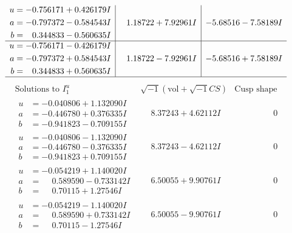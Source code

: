 \documentclass[1p]{elsarticle_modified}
\theoremstyle{definition}
\newcommand{\I}{\sqrt{-1}}
\begin{document}
$$\begin{array}{c|c|c}
\begin{aligned}
u &= -0.756171 + 0.426179 I \\
a &= -0.797372 - 0.584543 I \\
b &= \phantom{-}0.344833 - 0.560635 I\end{aligned}
 & \phantom{-}1.18722 + 7.92961 I & -5.68516 - 7.58189 I \\ \hline\begin{aligned}
u &= -0.756171 - 0.426179 I \\
a &= -0.797372 + 0.584543 I \\
b &= \phantom{-}0.344833 + 0.560635 I\end{aligned}
 & \phantom{-}1.18722 - 7.92961 I & -5.68516 + 7.58189 I\\
 \hline 
 \end{array}$$\newpage$$\begin{array}{c|c|c}  
\text{Solutions to }I^u_{1}& \I (\text{vol} + \sqrt{-1}CS) & \text{Cusp shape}\\
 \hline 
\begin{aligned}
u &= -0.040806 + 1.132090 I \\
a &= -0.446780 + 0.376335 I \\
b &= -0.941823 - 0.709155 I\end{aligned}
 & \phantom{-}8.37243 + 4.62112 I & \phantom{-0.000000 } 0 \\ \hline\begin{aligned}
u &= -0.040806 - 1.132090 I \\
a &= -0.446780 - 0.376335 I \\
b &= -0.941823 + 0.709155 I\end{aligned}
 & \phantom{-}8.37243 - 4.62112 I & \phantom{-0.000000 } 0 \\ \hline\begin{aligned}
u &= -0.054219 + 1.140020 I \\
a &= \phantom{-}0.589590 - 0.733142 I \\
b &= \phantom{-}0.70115 + 1.27546 I\end{aligned}
 & \phantom{-}6.50055 + 9.90761 I & \phantom{-0.000000 } 0 \\ \hline\begin{aligned}
u &= -0.054219 - 1.140020 I \\
a &= \phantom{-}0.589590 + 0.733142 I \\
b &= \phantom{-}0.70115 - 1.27546 I\end{aligned}
 & \phantom{-}6.50055 - 9.90761 I & \phantom{-0.000000 } 0 \\ \hline\begin{aligned}

\end{aligned}
\end{array}$$
\end{document}
